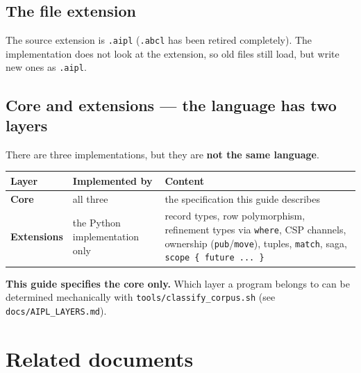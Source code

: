 \documentclass[11pt,a4paper]{article}
\begin{document}
\subsection{The file extension}

The source extension is \texttt{.aipl} (\texttt{.abcl} has been retired
completely). The implementation does not look at the extension, so old files
still load, but write new ones as \texttt{.aipl}.

\subsection{Core and extensions --- the language has two layers}

There are three implementations, but they are \textbf{not the same language}.

\begin{center}
\small
\begin{tabular}{@{}lp{4.0cm}p{5.4cm}@{}}
\toprule
Layer & Implemented by & Content \\
\midrule
\textbf{Core} & all three & the specification this guide describes \\
\textbf{Extensions} & the Python implementation only & record types, row
  polymorphism, refinement types via \texttt{where}, CSP channels, ownership
  (\texttt{pub}/\texttt{move}), tuples, \texttt{match}, saga,
  \texttt{scope \{ future ... \}} \\
\bottomrule
\end{tabular}
\end{center}

\textbf{This guide specifies the core only.} Which layer a program belongs to
can be determined mechanically with \texttt{tools/classify\_corpus.sh}
(see \texttt{docs/AIPL\_LAYERS.md}).

\section{Related documents}
\end{document}
